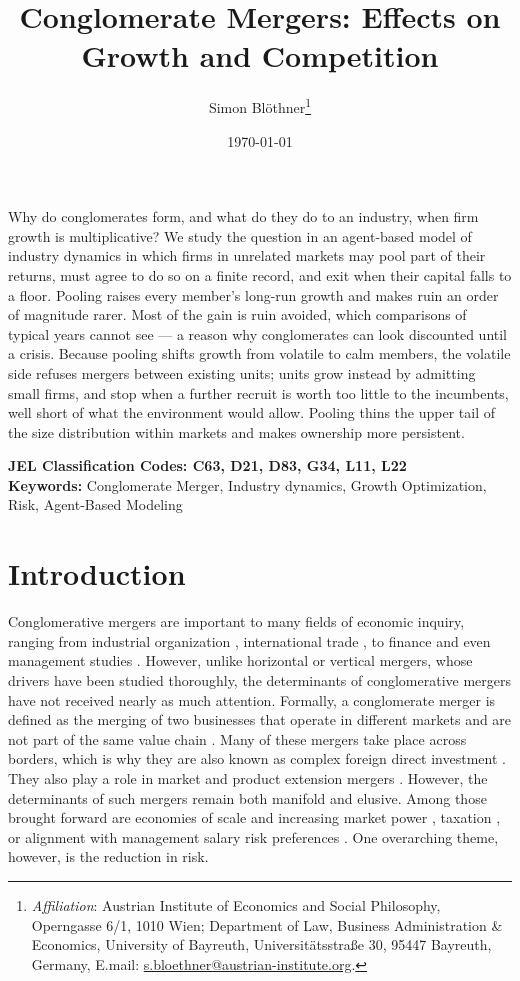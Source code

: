 \documentclass[12pt,a4paper]{article}
\title{Conglomerate Mergers: Effects on Growth and Competition}
\author{Simon Bl\"othner\thanks{\textit{Affiliation}: Austrian Institute of Economics and Social Philosophy, Operngasse 6/1, 1010 Wien; Department of Law, Business Administration \& Economics, University of Bayreuth, Universit\"atsstra\ss e 30, 95447 Bayreuth, Germany, E.mail: \href{s.bloethner@austrian-institute.org}{s.bloethner@austrian-institute.org}.}}
\date{\today}
\let\oldabstract\abstract
\let\endoldabstract\endabstract
\renewenvironment{abstract}
    {\begin{singlespace}
    \oldabstract}
    {\endoldabstract\end{singlespace}}
\begin{document}
\onehalfspacing

\maketitle
\begin{abstract}
{\noindent Why do conglomerates form, and what do they do to an industry, when firm growth is multiplicative? We study the question in an agent-based model of industry dynamics in which firms in unrelated markets may pool part of their returns, must agree to do so on a finite record, and exit when their capital falls to a floor. Pooling raises every member's long-run growth and makes ruin an order of magnitude rarer. Most of the gain is ruin avoided, which comparisons of typical years cannot see --- a reason why conglomerates can look discounted until a crisis. Because pooling shifts growth from volatile to calm members, the volatile side refuses mergers between existing units; units grow instead by admitting small firms, and stop when a further recruit is worth too little to the incumbents, well short of what the environment would allow. Pooling thins the upper tail of the size distribution within markets and makes ownership more persistent.}
\end{abstract}

{\noindent \textbf{\small{}JEL Classification Codes: C63, D21, D83, G34, L11, L22}} \\
\textbf{\small{}Keywords:}{\small{}{} Conglomerate Merger, Industry dynamics, Growth Optimization, Risk, Agent-Based Modeling}{\small\par}

\newpage

\section{Introduction}
Conglomerative mergers are important to many fields of economic inquiry, ranging from industrial organization \parencite{audretsch1989determinants, goldberg1973effect, goldberg1974conglomerate}, international trade \parencite{baltagi2007estimating, ramondo2010role, lind2023trade}, to finance \parencite{lewellen1971pure, boguth2022dissecting} and even management studies \parencite{amit1988concept, amihud1981risk}. However, unlike horizontal or vertical mergers, whose drivers have been studied thoroughly, the determinants of conglomerative mergers have not received nearly as much attention. Formally, a conglomerate merger is defined as the merging of two businesses that operate in different markets and are not part of the same value chain \parencite{scherer1990industrial}. Many of these mergers take place across borders, which is why they are also known as complex foreign direct investment \parencite{baltagi2007estimating}. They also play a role in market and product extension mergers \parencite{felton1971conglomerate}. However, the determinants of such mergers remain both manifold and elusive. Among those brought forward are economies of scale and increasing market power \parencite{mueller1969theory}, taxation \parencite{cohen1969conglomerate}, or alignment with management salary risk preferences \parencite{amihud1981risk}. One overarching theme, however, is the reduction in risk. 
\end{document}
